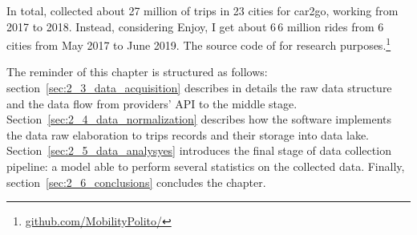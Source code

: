 
In total, \tool collected about 27 million of trips in 23 cities for car2go, working from 2017 to 2018. Instead, considering Enjoy, I get about 6\,6 million rides from 6 cities from May 2017 to June 2019. The source code of \tool for research purposes.\footnote{\url{github.com/MobilityPolito/}}


The reminder of this chapter is structured as follows: section~\ref{sec:2_3_data_acquisition} describes in details the raw data structure and the data flow from providers' API to the middle stage. Section~\ref{sec:2_4_data_normalization} describes how the software implements the data raw elaboration to trips records and their storage into data lake. Section~\ref{sec:2_5_data_analysyes} introduces the final stage of data collection pipeline: a model able to perform several statistics on the collected data. Finally, section~\ref{sec:2_6_conclusions} concludes the chapter.





%




